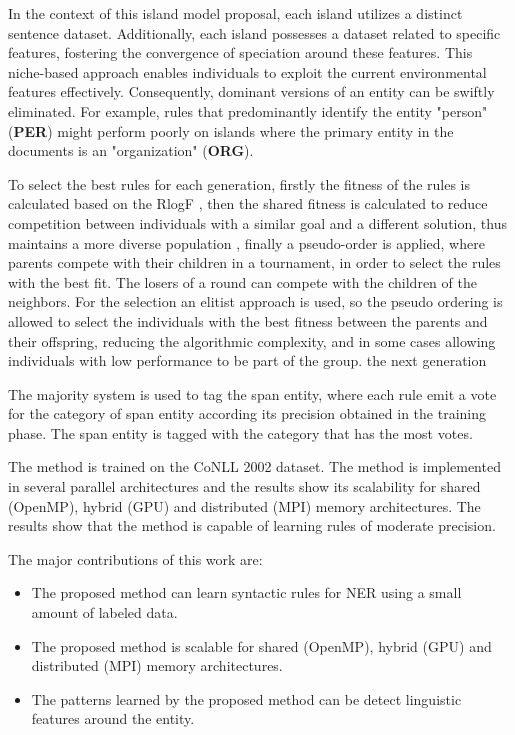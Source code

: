 In the context of this island model proposal, each island utilizes a distinct sentence dataset. Additionally, each island possesses a dataset related to specific features, fostering the convergence of speciation around these features. This niche-based approach enables individuals to exploit the current environmental features effectively. Consequently, dominant versions of an entity can be swiftly eliminated. For example, rules that predominantly identify the entity "person" (\textbf{PER}) might perform poorly on islands where the primary entity in the documents is an "organization" (\textbf{ORG}).

To select the best rules for each generation, firstly the fitness of the rules is calculated based on the RlogF \cite{seman_lex}, then the shared fitness is calculated to reduce competition between individuals with a similar goal and a different solution, thus maintains a more diverse population \cite{goldber_mul}, finally a pseudo-order is applied, where parents compete with their children in a tournament, in order to select the rules with the best fit. The losers of a round can compete with the children of the neighbors. For the selection an elitist approach is used, so the pseudo ordering is allowed to select the individuals with the best fitness between the parents and their offspring, reducing the algorithmic complexity, and in some cases allowing individuals with low performance to be part of the group. the next generation

The majority system is used to tag the span entity, where each rule emit a vote for the category of span entity according its precision obtained in the training phase. The span entity is tagged with the category that has the most votes.

The method is trained on the CoNLL 2002 \cite{tjong-kim-sang-2002-introduction} dataset. The method is implemented in several parallel architectures and the results show its scalability for shared (OpenMP), hybrid (GPU) and distributed (MPI) memory architectures. The results show that the method is capable of learning rules of moderate precision.

The major contributions of this work are:
\begin{itemize}
  \item The proposed method can learn syntactic rules for NER using a small amount of labeled data.
  \item The proposed method is scalable for shared (OpenMP), hybrid (GPU) and distributed (MPI) memory architectures.
  \item The patterns learned by the proposed method can be detect linguistic features around the entity.
\end{itemize}

